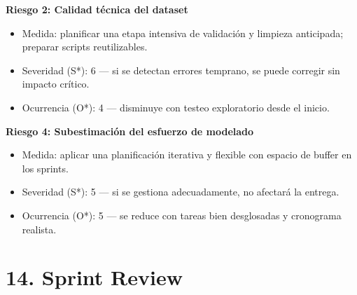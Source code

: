 \documentclass[
11pt, %
]{charter}
\begin{document}
\textbf{Riesgo 2: Calidad técnica del dataset}
\begin{itemize}
  \item Medida: planificar una etapa intensiva de validación y limpieza anticipada; preparar scripts reutilizables.
  \item Severidad (S*): 6 — si se detectan errores temprano, se puede corregir sin impacto crítico.
  \item Ocurrencia (O*): 4 — disminuye con testeo exploratorio desde el inicio.
\end{itemize}

\textbf{Riesgo 4: Subestimación del esfuerzo de modelado}
\begin{itemize}
  \item Medida: aplicar una planificación iterativa y flexible con espacio de buffer en los sprints.
  \item Severidad (S*): 5 — si se gestiona adecuadamente, no afectará la entrega.
  \item Ocurrencia (O*): 5 — se reduce con tareas bien desglosadas y cronograma realista.
\end{itemize}

\section{14. Sprint Review}
\label{sec:sprint_review}
\end{document}
